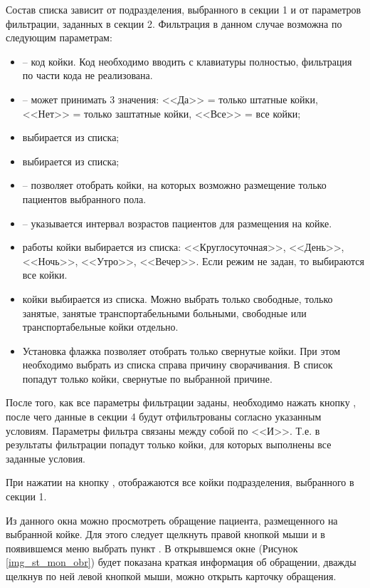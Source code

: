 Состав списка зависит от подразделения, выбранного в секции 1 и от параметров фильтрации, заданных в секции 2. Фильтрация в данном случае возможна по следующим параметрам:
\begin{itemize}
 \item {} – код койки. Код необходимо вводить с клавиатуры полностью, фильтрация по части кода не реализована.
 \item {} – может принимать 3 значения: <<Да>> = только штатные койки, <<Нет>> = только заштатные койки, <<Все>> = все койки;
 \item {} выбирается из списка;
 \item {} выбирается из списка;
 \item {} – позволяет отобрать койки, на которых возможно размещение только пациентов выбранного пола.
 \item {} – указывается интервал возрастов пациентов для размещения на койке.
 \item {} работы койки выбирается из списка: <<Круглосуточная>>, <<День>>, <<Ночь>>, <<Утро>>, <<Вечер>>. Если режим не задан, то выбираются все койки.
 \item {} койки выбирается из списка. Можно выбрать только свободные, только занятые, занятые транспортабельными больными, свободные или транспортабельные койки отдельно.
 \item Установка флажка  позволяет отобрать только свернутые койки. При этом необходимо выбрать из списка справа причину сворачивания. В список попадут только койки, свернутые по выбранной причине.
\end{itemize}
 
После того, как все параметры фильтрации заданы, необходимо нажать кнопку , после чего данные в секции 4 будут отфильтрованы согласно указанным условиям. Параметры фильтра связаны между собой по <<И>>. Т.е. в результаты фильтрации попадут только койки, для которых выполнены все заданные условия.

При нажатии на кнопку , отображаются все койки подразделения, выбранного в секции 1.

Из данного окна можно просмотреть обращение пациента, размещенного на выбранной койке. Для этого следует щелкнуть правой кнопкой мыши и в появившемся меню выбрать пункт . В открывшемся окне (Рисунок \ref{img_st_mon_obr}) будет показана краткая информация об обращении, дважды щелкнув по ней левой кнопкой мыши, можно открыть карточку обращения.

